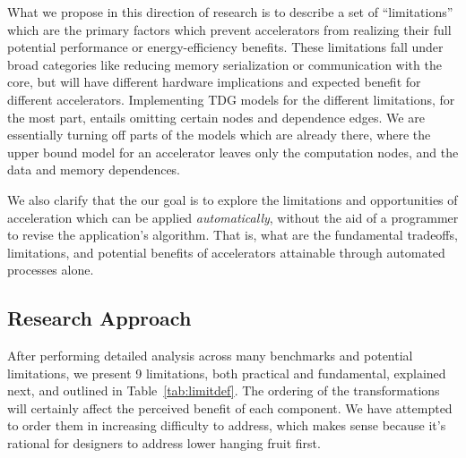 What we propose in this direction of research is to describe a set of ``limitations''
which are the primary factors which prevent accelerators from realizing their full
potential performance or energy-efficiency benefits.  These limitations fall under
broad categories like reducing memory serialization or communication with the core,
but will have different hardware implications and expected benefit for different
accelerators.  Implementing TDG models for the different limitations, for the most
part, entails omitting certain nodes and dependence edges.  We are essentially turning
off parts of the models which are already there, where the upper bound model for an
accelerator leaves only the computation nodes, and the data and memory dependences.

We also clarify that the our goal is to explore the limitations and opportunities of
acceleration which can be applied \emph{automatically}, without the aid of a programmer
to revise the application's algorithm. That is, what are the fundamental tradeoffs, 
limitations, and potential benefits of accelerators attainable through automated
processes alone.

\subsection{Research Approach}
After performing detailed analysis across many benchmarks and potential limitations, we
present 9 limitations, both practical and fundamental, explained next, and
outlined in Table~\ref{tab:limitdef}.
The ordering of the transformations will certainly affect the perceived benefit
of each component.  We have attempted to order them in increasing difficulty to
address, which makes sense because it's rational
for designers to address lower hanging fruit first.


